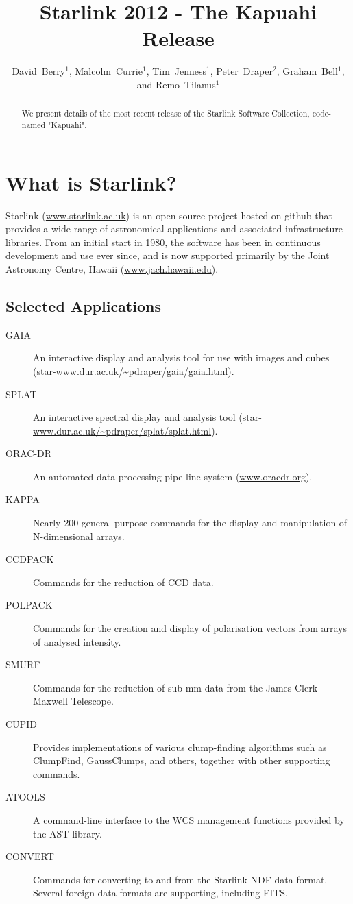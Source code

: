 \documentclass[11pt,twoside]{article}
\begin{document}
\title{Starlink 2012 - The Kapuahi Release}

\author{David~Berry$^1$, Malcolm~Currie$^1$, Tim~Jenness$^1$, Peter~Draper$^2$, Graham~Bell$^1$, and Remo~Tilanus$^1$
}

\begin{abstract}
We present details of the most recent release of the Starlink Software
Collection, code-named "Kapuahi".
\end{abstract}

\section{What is Starlink?}

Starlink (\url{www.starlink.ac.uk}) is an open-source project hosted on
github that provides a wide range of astronomical applications and
associated infrastructure libraries. From an initial start in 1980, the
software has been in continuous development and use ever since, and is
now supported primarily by the Joint Astronomy Centre, Hawaii
(\url{www.jach.hawaii.edu}).

\subsection{Selected Applications}
\begin{description}
\item[GAIA] An interactive display and analysis tool for use with images and
cubes (\url{star-www.dur.ac.uk/~pdraper/gaia/gaia.html}).
\item[SPLAT] An interactive spectral display and analysis tool (\url{star-www.dur.ac.uk/~pdraper/splat/splat.html}).
\item[ORAC-DR] An automated data processing pipe-line system
(\url{www.oracdr.org}).
\item[KAPPA] Nearly 200 general purpose commands for the display and manipulation of N-dimensional arrays.
\item[CCDPACK] Commands for the reduction of CCD data.
\item[POLPACK] Commands for the creation and display of polarisation vectors from arrays of analysed intensity.
\item[SMURF] Commands for the reduction of sub-mm data from the James Clerk Maxwell Telescope.
\item[CUPID] Provides implementations of various clump-finding algorithms such as ClumpFind, GaussClumps, and others, together with other supporting commands.
\item[ATOOLS] A command-line interface to the WCS management functions provided by the AST library.
\item[CONVERT] Commands for converting to and from the Starlink NDF data format. Several foreign data formats are supporting, including FITS.
\end{description}
\end{document}
